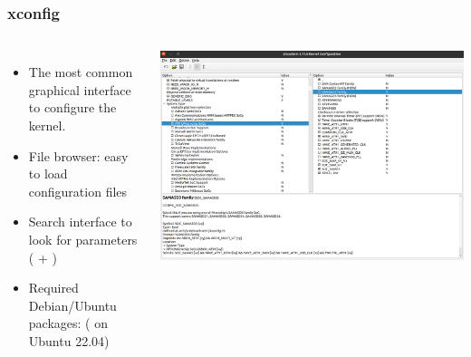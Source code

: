 \begin{frame}
  \frametitle{xconfig}
  \begin{columns}
    \begin{itemize}
    \item The most common graphical interface to configure the kernel.
    \item File browser: easy to load configuration files
    \item Search interface to look for parameters (\code{[Ctrl]} + \code{[f]})
    \item Required Debian/Ubuntu packages: 
          ( on Ubuntu 22.04)
    \end{itemize}
    \includegraphics[width=\textwidth]{slides/sysdev-kernel-building/xconfig-screenshot.png}
  \end{columns}
\end{frame}

